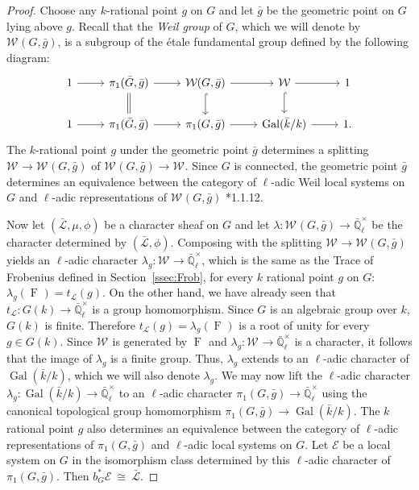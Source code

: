 \documentclass[10pt]{amsart}
\theoremstyle{plain}
\theoremstyle{definition}
\theoremstyle{remark}
\newcommand{\EE}{\mathbb{\bar Q}_\ell}
\newcommand{\bFq}{\bar{k}}
\newcommand{\Fq}{k}
\newcommand{\EEx}{\EE^\times}
\newcommand{\Weil}[1]{\mathcal{W}_{#1}}
\DeclareMathOperator{\Gal}{Gal}
\newcommand{\Frob}[1]{\operatorname{F}_{#1}}
\newcommand{\iso}{{\ \cong\ }}
\newcommand{\trFrob}[1]{t_{#1}}
\newcommand{\cs}[1]{{\mathcal{#1}}}
\newcommand{\gcs}[1]{{\mathcal{\bar #1}}}
\newcommand{\bg}{\bar{g}}
\newcommand{\bG}{\bar{G}}
\begin{document}
\begin{proof}
Choose any $\Fq$-rational point $g$ on $G$ and let $\bg$ be the geometric point on $G$ lying above $g$.
Recall that the \emph{Weil group} of $G$, which we will denote by $\Weil{}(G,\bg)$, is a subgroup of the \'etale
fundamental group defined by the following diagram:
\[
 \begin{tikzcd}
 1 \rar & \ar[equal]{d} \pi_1(\bG, \bg) \rar & \Weil{}(G,\bg) \rar \dar[hook] & \Weil{} \rar \dar[hook] & 1 \\
 1 \rar &  \pi_1(\bG, \bg) \rar & \pi_1(G,\bg) \rar & \Gal(\bFq/\Fq) \rar & 1.
 \end{tikzcd}
\]
The $\Fq$-rational point $g$ under the geometric point $\bg$ determines a splitting
$\Weil{}\to \Weil{}(G,\bg)$ of $\Weil{}(G,\bg)\to \Weil{}$.
%
  Since $G$ is connected, the geometric point $\bg$ determines
  an equivalence between the category of $\ell$-adic Weil local systems on $G$ and
  $\ell$-adic representations of $\Weil{}(G,\bg)$ \cite{deligne:80a}*{1.1.12}.
  
  Now let $(\gcs{L},\mu,\phi)$ be a character sheaf on $G$
  and let $\lambda : \Weil{}(G, \bg) \to \EEx$ be the character determined by $(\gcs{L},\phi)$.
  Composing with the splitting $\Weil{} \to \Weil{}(G,\bg)$ yields an $\ell$-adic character
  $\lambda_g : \Weil{} \to \EEx$, which is the same as the Trace of Frobenius defined in Section~\ref{ssec:Frob}, for every $\Fq$ rational point $g$ on $G$:
  $
  \lambda_g(\Frob{}) =  \trFrob{\cs{L}}(g).
  $
%
  On the other hand, we have already seen that $\trFrob{\cs{L}} : G(\Fq) \to \EEx$
  is a group homomorphism. 
  Since $G$ is an algebraic group over $\Fq$, $G(\Fq)$ is finite.
  Therefore $\trFrob{\cs{L}}(g) = \lambda_g(\Frob{})$ is a root of unity
  for every $g\in G(\Fq)$.  Since $\Weil{}$ is generated by
  $\Frob{}$ and $\lambda_g : \Weil{} \to \EEx$ is
  a character, it follows that the image of $\lambda_g$ is a finite group.
  Thus, $\lambda_g$ extends to an $\ell$-adic character of $\Gal(\bFq/\Fq)$,
  which we will also denote $\lambda_g$.
%
  We may now lift the $\ell$-adic character $\lambda_g : \Gal(\bFq/\Fq) \to \EEx$
  to an $\ell$-adic character $\pi_1(G,\bg) \to \EEx$ using the canonical topological group homomorphism
  $\pi_1(G,\bg) \to \Gal(\bFq/\Fq)$. 
  The $\Fq$ rational point $g$ also
  determines an equivalence between the category of $\ell$-adic
  representations of $\pi_1(G,\bg)$ and $\ell$-adic local systems on $G$. Let
  $\cs{E}$ be a local system on $G$ in the isomorphism class
  determined by this $\ell$-adic character of $\pi_1(G,\bg)$.
  Then $b_G^*\cs{E} \iso \gcs{L}$.
  

\end{proof}
\end{document}
